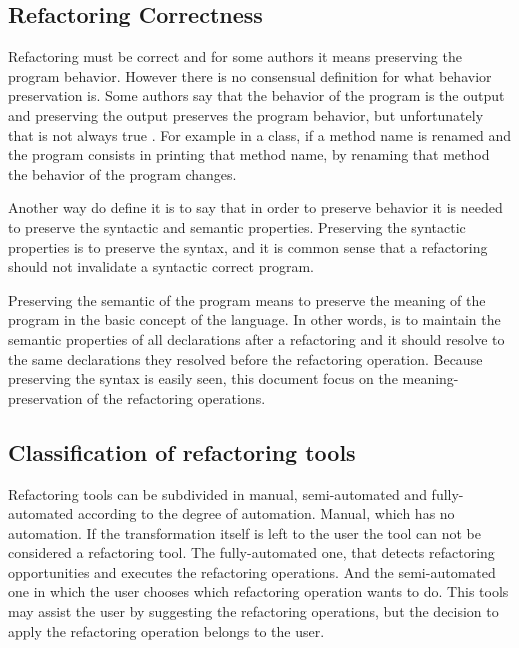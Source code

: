 \subsection{Refactoring Correctness}
Refactoring must be correct and for some authors it means preserving the program behavior.
However there is no consensual definition for what behavior preservation is.
Some authors say that the behavior of the program is the output and preserving the output preserves the program behavior, but unfortunately that is not always true \cite{erb2010survey}.
For example in a class, if a method name is renamed and the program consists in printing that method name, by renaming that method the behavior of the program changes.

Another way do define it is to say that in order to preserve behavior it is needed to preserve the syntactic and semantic properties.
Preserving the syntactic properties is to preserve the syntax, and it is common sense that a refactoring should not invalidate a syntactic correct program.

Preserving the semantic of the program means to preserve the meaning of the program in the basic concept of the language. 
In other words, is to  maintain the semantic properties of all declarations after a refactoring and it should resolve to the same declarations they resolved before the refactoring operation.
Because preserving the syntax is easily seen, this document focus on the meaning-preservation of the refactoring operations. 






\subsection{Classification of refactoring tools} %
Refactoring tools can be subdivided in manual, semi-automated and fully-automated according to the degree of automation.
Manual, which has no automation. If the transformation itself is left to the user the tool can not be considered a refactoring tool.
The fully-automated one, that detects refactoring opportunities and executes the refactoring operations. 
And the semi-automated one in which the user chooses which refactoring operation wants to do. 
This tools may assist the user by suggesting the refactoring operations, but the decision to apply the refactoring operation belongs to the user. \cite{erb2010survey}



